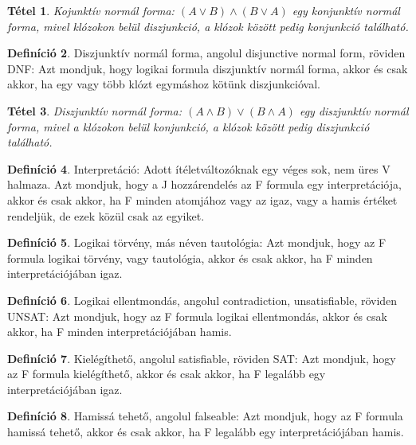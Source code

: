 \documentclass[
]{thesis-ekf}
\newtheorem{tetel}{Tétel}[chapter]
\theoremstyle{definition}
\newtheorem{definicio}[tetel]{Definíció}
\theoremstyle{remark}
\begin{document}
	\begin{tetel}
		Kojunktív normál forma: $ (A\vee B)\wedge(B\vee A) $ egy konjunktív normál forma, mivel klózokon belül diszjunkció, a klózok között pedig konjunkció található.
	\end{tetel}

	\begin{definicio}\label{def-dnf}
		Diszjunktív normál forma, angolul disjunctive normal form, röviden \textsc{DNF}: Azt mondjuk, hogy logikai formula diszjunktív normál forma, akkor és csak akkor, ha egy vagy több klózt egymáshoz kötünk diszjunkcióval.
	\end{definicio}

	\begin{tetel}
		Diszjunktív normál forma: $ (A\wedge B)\vee(B\wedge A) $ egy diszjunktív normál forma, mivel a klózokon belül konjunkció, a klózok között pedig diszjunkció található.
	\end{tetel}

	\begin{definicio}
		Interpretáció: Adott ítéletváltozóknak egy véges sok, nem üres V halmaza.
		Azt mondjuk, hogy a J hozzárendelés az F formula egy interpretációja, akkor és csak akkor, ha F minden atomjához vagy az igaz, vagy a hamis értéket rendeljük, de ezek közül csak az egyiket.
	\end{definicio}

	\begin{definicio}\label{def-tautologia}
		Logikai törvény, más néven tautológia: Azt mondjuk, hogy az F formula logikai törvény, vagy tautológia, akkor és csak akkor, ha F minden interpretációjában igaz.
	\end{definicio}

	\begin{definicio}
		Logikai ellentmondás, angolul contradiction, unsatisfiable, röviden UNSAT: Azt mondjuk, hogy az F formula logikai ellentmondás, akkor és csak akkor, ha F minden interpretációjában hamis.
	\end{definicio}

	\begin{definicio}
		Kielégíthető, angolul satisfiable, röviden \textsc{SAT}: Azt mondjuk, hogy az F formula kielégíthető, akkor és csak akkor, ha F legalább egy interpretációjában igaz.
	\end{definicio}

	\begin{definicio}
		Hamissá tehető, angolul falseable: Azt mondjuk, hogy az F formula hamissá tehető, akkor és csak akkor, ha F legalább egy interpretációjában hamis. 
	\end{definicio}
\end{document}
